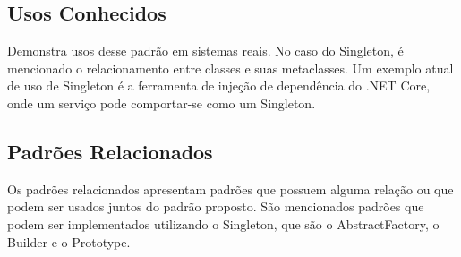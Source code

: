 \subsection*{Usos Conhecidos}

Demonstra usos desse padrão em sistemas reais. No caso 
do Singleton, é mencionado o relacionamento entre 
classes e suas metaclasses. Um exemplo atual de uso 
de Singleton é a ferramenta de injeção de dependência 
do .NET Core, onde um serviço 
pode comportar-se como um Singleton\cite{didotnet}.

\subsection*{Padrões Relacionados}

Os padrões relacionados apresentam padrões que 
possuem alguma relação ou que podem ser usados juntos 
do padrão proposto. São mencionados padrões que 
podem ser implementados utilizando o Singleton, que 
são o AbstractFactory, o Builder e o Prototype.

